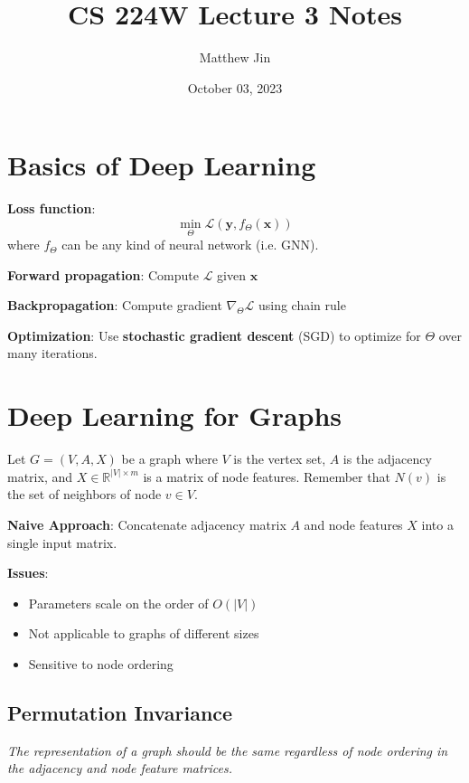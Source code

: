 \documentclass[12pt]{article}
\newcommand{\tbf}{\textbf}
\newcommand{\tit}{\textit}
\newcommand{\mbf}{\mathbf}
\newcommand{\mcal}{\mathcal}
\newcommand{\mbb}{\mathbb}
\begin{document}
\title{CS 224W Lecture 3 Notes}
\author{Matthew Jin}
\date{October 03, 2023}
\maketitle

\section*{Basics of Deep Learning}

\textbf{Loss function}:
\[
  \min_{\Theta} \mcal{L} \left(\mbf{y}, f_{\Theta}(\mbf{x})\right)
\]
where $f_{\Theta}$ can be any kind of neural network (i.e. GNN).

\smallskip
\tbf{Forward propagation}: Compute $\mcal{L}$ given $\mbf{x}$

\smallskip
\tbf{Backpropagation}: Compute gradient $\nabla_\Theta \mcal{L}$ using chain
rule

\smallskip
\tbf{Optimization}: Use \tbf{stochastic gradient descent} (SGD) to optimize for
$\Theta$ over many iterations.

\section*{Deep Learning for Graphs}

Let $G=(V,A,X)$ be a graph where $V$ is the vertex set,
$A$ is the adjacency matrix, and $X \in \mbb{R}^{|V| \times m}$ is a
matrix of node features. Remember that $N(v)$ is the set of neighbors of node $v
\in V$.

\medskip
\tbf{Naive Approach}: Concatenate adjacency matrix $A$ and node features
$X$ into a single input matrix.

\tbf{Issues}:
\begin{itemize}
  \item Parameters scale on the order of $O(|V|)$
  \item Not applicable to graphs of different sizes
  \item Sensitive to node ordering
\end{itemize}

\subsection*{Permutation Invariance}

\tit{The representation of a graph should be the same regardless of node
ordering in the adjacency and node feature matrices.}
\end{document}
